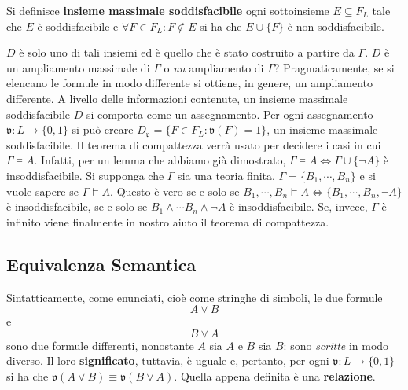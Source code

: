 \begin{defi}
  Si definisce \textbf{insieme massimale soddisfacibile} 
  ogni sottoinsieme $E \subseteq F_L$ tale che 
$E$ è soddisfacibile e $\forall F \in F_L : F\notin E$ si ha che $E \cup \{F\}$ è 
non soddisfacibile. 
\end{defi}
$D$ è solo uno di tali insiemi ed è quello che è stato 
costruito a partire da $\Gamma$. $D$ è un ampliamento massimale di $\Gamma$ o 
\textit{un} ampliamento di $\Gamma$? 
Pragmaticamente, se si elencano le formule in modo differente si ottiene, in genere, 
un ampliamento differente.
A livello delle informazioni contenute, un insieme massimale soddisfacibile $D$ 
si comporta come un assegnamento. Per ogni assegnamento $\mathfrak{v} : L \rightarrow \{0,1\}$ 
si può creare $D_\mathfrak{v} = \{ F \in F_L : \mathfrak{v}(F) = 1\}$, un 
insieme massimale soddisfacibile. 
Il teorema di compattezza verrà usato per decidere i casi in cui $\Gamma \models A$. 
Infatti, per un lemma che abbiamo già dimostrato, $\Gamma \models A \iff \Gamma \cup \{\neg A \} $
è insoddisfacibile. Si supponga che $\Gamma$ sia una teoria finita, 
$\Gamma = \{B_1, \cdots, B_n\}$ e si vuole sapere se $\Gamma \models A$. 
Questo è vero se e solo se $B_1, \cdots, B_n \models A \iff \{B_1, \cdots,B_n,\neg A\}$ è 
insoddisfacibile, se e solo se $B_1 \land \cdots B_n \land \neg A$ è 
insoddisfacibile. Se, invece, $\Gamma$ è infinito viene finalmente in 
nostro aiuto il teorema di compattezza. 

\subsection{Equivalenza Semantica}
Sintatticamente, come enunciati, cioè come stringhe di simboli, le 
due formule 
$$
A \lor B
$$ 
e 
$$
B \lor A 
$$ 
sono due formule differenti, nonostante $A$ sia $A$ e $B$ 
sia $B$: sono \textit{scritte} in modo diverso. Il loro \textbf{significato}, 
tuttavia, è uguale e, pertanto, per ogni $\mathfrak{v} : L \rightarrow \{0,1\}$ si ha che 
$\mathfrak{v}(A \lor B) \equiv \mathfrak{v}(B \lor A)$. Quella appena 
definita è una \textbf{relazione}. 

